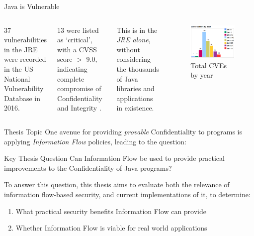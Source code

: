 \begin{frame}{Java is Vulnerable}
	\begin{columns}
			37 vulnerabilities in the JRE were recorded in the US National Vulnerability Database in 2016.\newline
			
			13 were listed as `critical', with a CVSS score $ > $ 9.0, indicating complete compromise of Confidentiality and Integrity \cite{nvd:jdk2016cvss9}.\newline
			
			This is in the \textit{JRE alone}, without considering the thousands of Java libraries and applications in existence.
		\begin{figure}
			\includegraphics[scale=0.25]{content/images/cvedetails_vulnsperyear.png}
			\caption{Total CVEs by year \cite{cvedetails:jdk2016}}
		\end{figure}
	\end{columns}	
\end{frame}



\begin{frame}{Thesis Topic}
	One avenue for providing \textit{provable} Confidentiality to programs is applying \textit{Information Flow} policies, leading to the question:
	
	\begin{block}{Key Thesis Question}
		Can Information Flow be used to provide practical improvements to the Confidentiality of Java programs?
	\end{block}
	
	To answer this question, this thesis aims to evaluate both the relevance of information flow-based security, and current implementations of it, to determine:
	
	\begin{enumerate}
		\item What practical security benefits Information Flow can provide
		\item Whether Information Flow is viable for real world applications
	\end{enumerate}
\end{frame}